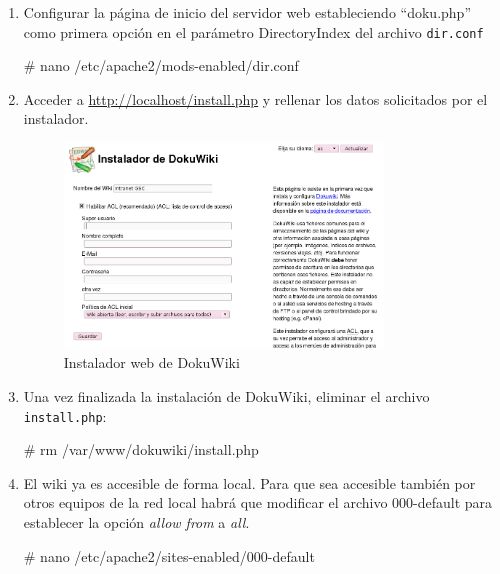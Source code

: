 \begin{enumerate}
\item Configurar la página de inicio del servidor web estableciendo ``doku.php'' como primera opción en el parámetro DirectoryIndex del archivo \texttt{dir.conf}

\begin{listing}[style=consola, numbers=none]
# nano /etc/apache2/mods-enabled/dir.conf
\end{listing}

\item Acceder a \url{http://localhost/install.php} y rellenar los datos solicitados por el instalador.

\begin{figure}[htb!]
 \centering
 \includegraphics[width=0.8\textwidth]{Utils/instalador_wiki.png}
 \caption{Instalador web de DokuWiki}
 \label{fig:instalador_wiki}
\end{figure}

\item Una vez finalizada la instalación de DokuWiki, eliminar el archivo \texttt{install.php}:
\begin{listing}[style=consola, numbers=none]
# rm /var/www/dokuwiki/install.php
\end{listing}

\item El wiki ya es accesible de forma local. Para que sea accesible también por otros equipos de la red local habrá que modificar el archivo 000-default para establecer la opción \textit{allow from} a \textit{all}.
\begin{listing}[style=consola, numbers=none]
# nano /etc/apache2/sites-enabled/000-default
\end{listing}
\end{enumerate}

